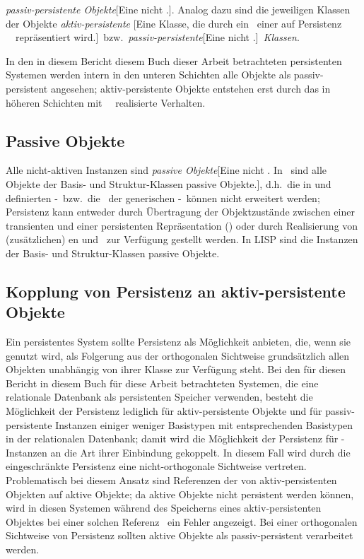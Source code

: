{\em passiv-persistente Objekte\/}[{Eine nicht \protect{}.}].
Analog dazu sind die jeweiligen Klassen der Objekte
{\em aktiv-persistente\/}
[{Eine Klasse, die durch ein \protect\clsmo\ einer auf Persistenz
{\protect\spc[n]}\ \protect\clsmc\ repr\"{a}sentiert
wird.}]\ bzw.\ {\em passiv-persistente\/}[{Eine nicht
\protect{}.}]{\em\ Klassen}.
%
\par{}In den in \ifbericht diesem Bericht \else\ifbuch diesem Buch
\else dieser Arbeit \fi\fi betrachteten persistenten Systemen werden
intern in den unteren Schichten alle Objekte als passiv-persistent
angesehen; aktiv-persistente Objekte entstehen erst durch das in
h\"{o}heren Schichten mit \spc[n]\ \mtd[n]\ realisierte Verhalten.
%
\subsection{Passive Objekte}
%
Alle nicht-aktiven Instanzen sind {\em passive
Objekte}[{Eine nicht \protect{}. In \protect\cl\ sind alle Objekte der Basis- und
Struktur-Klassen passive Objekte.}], d.h.\ die in \cite{bib:st90} und
\cite{bib:amop91} definierten \std-\fn[en]\ bzw.\ die \mtd[n]\ der
generischen \std-\fn[en]\ k\"{o}nnen nicht erweitert werden; Persistenz
kann entweder durch \"{U}bertragung der Objektzust\"{a}nde zwischen einer
transienten und einer persistenten Repr\"{a}sentation (\swizzling\/) oder
durch Realisierung von (zus\"{a}tzlichen) \gfn[n]en und \mtd[n]\ zur
Verf\"{u}gung gestellt werden.  In LISP sind die Instanzen der Basis- und
Struktur-Klassen passive Objekte.
%
\subsection{Kopplung von Persistenz an aktiv-persistente Objekte}
%
Ein persistentes System sollte Persistenz als M\"{o}glichkeit
anbieten, die, wenn sie genutzt wird, als Folgerung aus der
orthogonalen Sichtweise grunds\"{a}tzlich allen Objekten
unabh\"{a}ngig von ihrer Klasse zur Verf\"{u}gung steht. Bei den
\ifbericht f\"{u}r diesen Bericht \else\ifbuch in diesem Buch \else
f\"{u}r diese Arbeit \fi\fi betrachteten Systemen, die eine
relationale Datenbank als persistenten Speicher verwenden, besteht die
M\"{o}glichkeit der Persistenz lediglich f\"{u}r aktiv-persistente
Objekte und f\"{u}r passiv-persistente Instanzen einiger weniger
Basistypen mit entsprechenden Basistypen in der relationalen
Datenbank; damit wird die M\"{o}glichkeit der Persistenz f\"{u}r
\clos-Instanzen an die Art ihrer Einbindung gekoppelt. In diesem Fall
wird durch die eingeschr\"{a}nkte Persistenz eine nicht-orthogonale
Sichtweise vertreten. Problematisch bei diesem Ansatz sind Referenzen
der \Slt[s]\/ von aktiv-persistenten Objekten auf aktive Objekte; da
aktive Objekte nicht persistent werden k\"{o}nnen, wird in diesen
Systemen w\"{a}hrend des Speicherns eines aktiv-persistenten Objektes
bei einer solchen Referenz \ia\ ein Fehler angezeigt. Bei einer
orthogonalen Sichtweise von Persistenz sollten aktive Objekte als
passiv-persistent verarbeitet werden.
%
